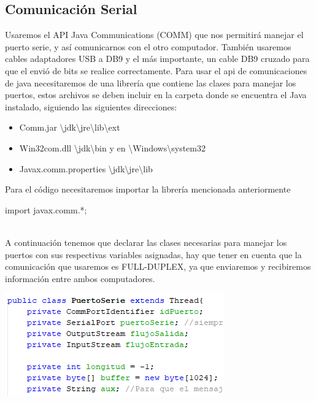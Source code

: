 \documentclass[letterpaper, 10 pt, conference]{ieeeconf}
\begin{document}
\subsection{Comunicación Serial}
Usaremos el API Java Communications (COMM) que nos permitirá manejar el puerto serie, y así comunicarnos con el otro computador. 
También usaremos cables adaptadores USB a DB9 y el más importante, un cable DB9 cruzado para que el envió de bits se realice correctamente.
Para usar el api de comunicaciones de java necesitaremos de una librería que contiene las clases para manejar los puertos, estos archivos se deben incluir en la carpeta donde se encuentra el Java instalado, siguiendo las siguientes direcciones:
\begin{itemize}
    \item Comm.jar \textbackslash jdk\textbackslash jre\textbackslash lib\textbackslash ext
    \item Win32com.dll  \textbackslash jdk\textbackslash bin y en \textbackslash Windows\textbackslash system32
    \item Javax.comm.properties \textbackslash jdk\textbackslash jre\textbackslash lib
\end{itemize}
	
Para el código necesitaremos importar la librería mencionada anteriormente
\\
\begin{center}
    import javax.comm.*; 
\end{center}
\\
A continuación tenemos que declarar las clases necesarias para manejar los puertos con sus respectivas variables asignadas, hay que tener en cuenta que la comunicación que usaremos es FULL-DUPLEX, ya que enviaremos y recibiremos información entre ambos computadores.
\begin{center}
\includegraphics[scale=0.8]{Documento/Figuras/1.PNG}
\begin{scriptsize}
\\ 
\end{scriptsize}
\end{center}
\end{document}

